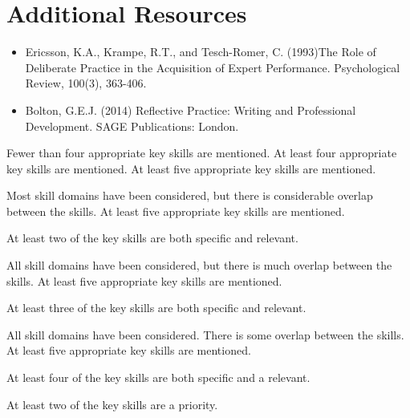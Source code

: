 \documentclass{../../fal_assignment}
\begin{document}
\section*{Additional Resources}

\begin{itemize}
    \item Ericsson, K.A., Krampe, R.T., and Tesch-Romer, C. (1993)The Role of Deliberate Practice in the Acquisition of Expert Performance. Psychological Review, 100(3), 363-406.
    \item Bolton, G.E.J. (2014) Reflective Practice: Writing and Professional Development. SAGE Publications: London.
\end{itemize}

\begin{markingrubric}
%
%
        \grade\fail 	Fewer than four appropriate key skills are mentioned.
        \grade 		At least four appropriate key skills are mentioned.
        \grade 		At least five appropriate key skills are mentioned.
        \par 		Most skill domains have been considered, but there is considerable overlap between the skills.
        \grade 		At least five appropriate key skills are mentioned.
        \par 		At least two of the key skills are both specific and relevant.
        \par 		All skill domains have been considered, but there is much overlap between the skills.
        \grade 		At least five appropriate key skills are mentioned.
        \par 		At least three of the key skills are both specific and relevant.
        \par 		All skill domains have been considered. There is some overlap between the skills.
        \grade 		At least five appropriate key skills are mentioned.
        \par 		At least four of the key skills are both specific and a relevant.
        \par 		At least two of the key skills are a priority.

\end{markingrubric}
\end{document}
